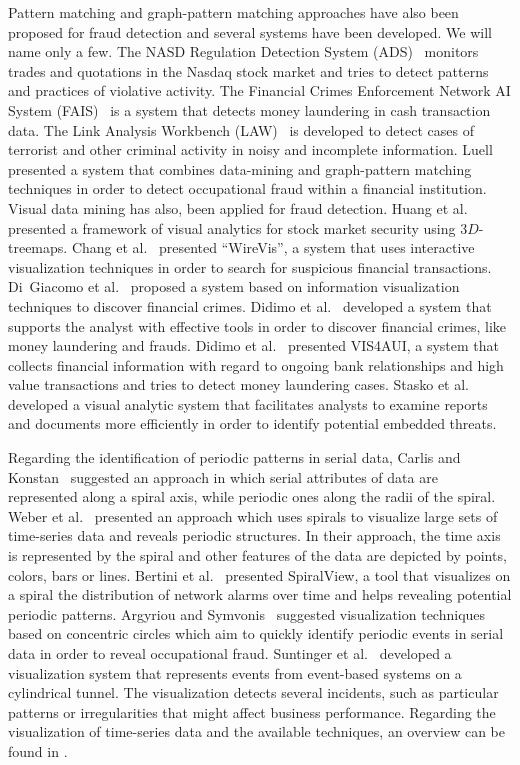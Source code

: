 \documentclass[conference]{IEEEtran}
\begin{document}
Pattern matching and graph-pattern matching approaches have also
been proposed for fraud detection and several systems have been
developed. We will name only a few. The NASD Regulation Detection
System (ADS)~\cite{KSH*S98, Sen00, SGS*02} monitors trades and
quotations in the Nasdaq stock market and tries to detect patterns
and practices of violative activity. The Financial Crimes
Enforcement Network AI System (FAIS)~\cite{GS95, SGW*95} is a system
that detects money laundering in cash transaction data. The Link
Analysis Workbench (LAW)~\cite{WBH*03} is developed to detect cases
of terrorist and other criminal activity in noisy and incomplete
information. Luell~\cite{Lue10} presented a system that combines
data-mining and graph-pattern matching techniques in order to detect
occupational fraud within a financial institution. Visual data
mining has also, been applied for fraud detection. Huang et
al.~\cite{HLN09} presented a framework of visual analytics for stock
market security using $3D$-treemaps. Chang et al.~\cite{CLG*08}
presented ``WireVis'', a system that uses interactive visualization
techniques in order to search for suspicious financial transactions.
Di~Giacomo et al.~\cite{GDLP10} proposed a system based on
information visualization techniques to discover financial crimes.
Didimo et al.~\cite{DLMP11} developed a system that supports the
analyst with effective tools in order to discover financial crimes,
like money laundering and frauds. Didimo et al.~\cite{DLM12}
presented VIS4AUI, a system that collects financial information with
regard to ongoing bank relationships and high value transactions and
tries to detect money laundering cases. Stasko et al.~\cite{SGL08}
developed a visual analytic system that facilitates analysts to
examine reports and documents more efficiently in order to identify
potential embedded threats.

Regarding the identification of periodic patterns in serial data,
Carlis and Konstan~\cite{CK98} suggested an approach in which serial
attributes of data are represented along a spiral axis, while
periodic ones along the radii of the spiral. Weber et
al.~\cite{WMM01} presented an approach which uses spirals to
visualize large sets of time-series data and reveals periodic
structures. In their approach, the time axis is represented by the
spiral and other features of the data are depicted by points,
colors, bars or lines. Bertini et al.~\cite{BHL07} presented
SpiralView, a tool that visualizes on a spiral the distribution of
network alarms over time and helps revealing potential periodic
patterns. Argyriou and Symvonis~\cite{AS12} suggested visualization
techniques based on concentric circles which aim to quickly identify
periodic events in serial data in order to reveal occupational
fraud. Suntinger et al.~\cite{SOSG08} developed a visualization
system that represents events from event-based systems on a
cylindrical tunnel. The visualization detects several incidents,
such as particular patterns or irregularities that might affect
business performance. Regarding the visualization of time-series
data and the available techniques, an overview can be found in
\cite{ABMTS07, MS03, SC00}.
\end{document}
